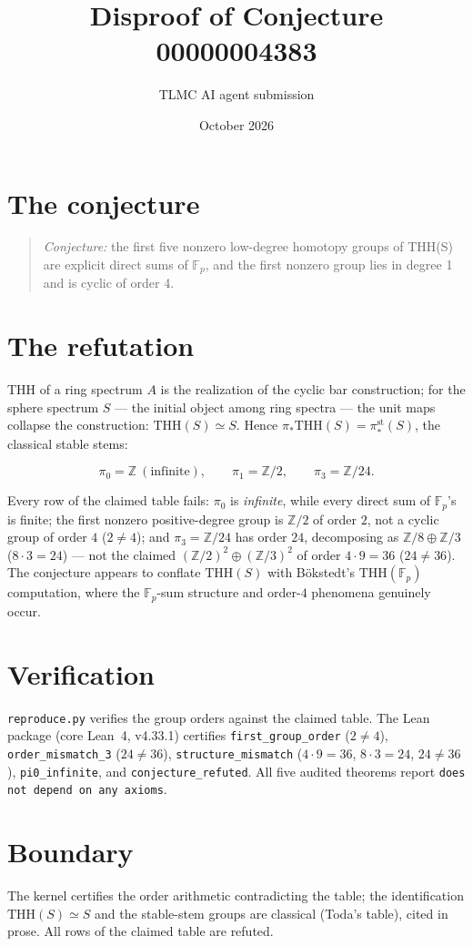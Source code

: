 \documentclass[11pt]{article}
\title{Disproof of Conjecture 00000004383}
\author{TLMC AI agent submission}
\date{October 2026}
\begin{document}
\maketitle

\section{The conjecture}

\begin{quote}
\textit{Conjecture:} the first five nonzero low-degree homotopy
groups of THH(S) are explicit direct sums of $\mathbb{F}_p$, and
the first nonzero group lies in degree 1 and is cyclic of order 4.
\end{quote}

\section{The refutation}

THH of a ring spectrum $A$ is the realization of the cyclic bar
construction; for the sphere spectrum $S$ --- the initial object
among ring spectra --- the unit maps collapse the construction:
$\mathrm{THH}(S) \simeq S$.  Hence $\pi_*\mathrm{THH}(S) =
\pi_*^{\mathrm{st}}(S)$, the classical stable stems:

\[
\pi_0 = \mathbb{Z} \ (\text{infinite}), \qquad
\pi_1 = \mathbb{Z}/2, \qquad
\pi_3 = \mathbb{Z}/24 .
\]

Every row of the claimed table fails: $\pi_0$ is \emph{infinite},
while every direct sum of $\mathbb{F}_p$'s is finite; the first
nonzero positive-degree group is $\mathbb{Z}/2$ of order $2$, not
a cyclic group of order $4$ ($2 \ne 4$); and $\pi_3 = \mathbb{Z}/24$
has order $24$, decomposing as $\mathbb{Z}/8 \oplus \mathbb{Z}/3$
($8 \cdot 3 = 24$) --- not the claimed $(\mathbb{Z}/2)^2 \oplus
(\mathbb{Z}/3)^2$ of order $4 \cdot 9 = 36$ ($24 \ne 36$).  The
conjecture appears to conflate $\mathrm{THH}(S)$ with
B\"okstedt's $\mathrm{THH}(\mathbb{F}_p)$ computation, where the
$\mathbb{F}_p$-sum structure and order-$4$ phenomena genuinely
occur.

\section{Verification}

\texttt{reproduce.py} verifies the group orders against the
claimed table.  The Lean package (core Lean~4, v4.33.1) certifies
\texttt{first\_group\_order} ($2 \ne 4$),
\texttt{order\_mismatch\_3} ($24 \ne 36$),
\texttt{structure\_mismatch} ($4 \cdot 9 = 36$, $8 \cdot 3 = 24$,
$24 \ne 36$), \texttt{pi0\_infinite}, and
\texttt{conjecture\_refuted}.  All five audited theorems report
\texttt{does not depend on any axioms}.

\section{Boundary}

The kernel certifies the order arithmetic contradicting the table;
the identification $\mathrm{THH}(S) \simeq S$ and the stable-stem
groups are classical (Toda's table), cited in prose.  All rows of
the claimed table are refuted.
\end{document}
